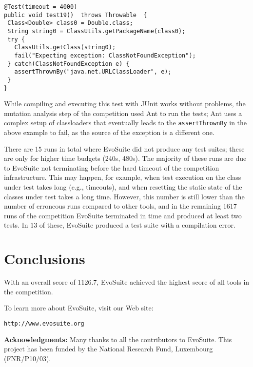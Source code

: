 \documentclass[10pt,conference]{IEEEtran}
\newcommand{\EVOSUITE}{{\sc EvoSuite}\xspace}
\begin{document}
\begin{lstlisting}
@Test(timeout = 4000)
public void test19()  throws Throwable  {
 Class<Double> class0 = Double.class;
 String string0 = ClassUtils.getPackageName(class0);
 try { 
   ClassUtils.getClass(string0);
   fail("Expecting exception: ClassNotFoundException"); 
 } catch(ClassNotFoundException e) {
   assertThrownBy("java.net.URLClassLoader", e);
 }
}
\end{lstlisting}

While compiling and executing this test with JUnit works without
problems, the mutation analysis step of the competition used Ant to
run the tests; Ant uses a complex setup of classloaders that
eventually leads to the \texttt{assertThrownBy} in the above example
to fail, as the source of the exception is a different one.

There are 15 runs in total where \EVOSUITE did not produce any test
suites; these are only for higher time budgets (240s, 480s). The
majority of these runs are due to \EVOSUITE not terminating before the
hard timeout of the competition infrastructure. This may happen, for
example, when test execution on the class under test takes long (e.g.,
timeouts), and when resetting the static state of the classes under
test takes a long time. However, this number is still lower than the
number of erroneous runs compared to other tools, and in the remaining
1617 runs of the competition \EVOSUITE terminated in time and produced
at least two tests. In 13 of these, \EVOSUITE produced a test suite
with a compilation error.

\section{Conclusions}

With an overall score of 1126.7, \EVOSUITE achieved the highest score
of all tools in the competition. 


To learn more about \EVOSUITE, visit our Web site:
\begin{center}
\texttt{http://www.evosuite.org}
\end{center}



\textbf{Acknowledgments:} Many thanks to all the contributors to \EVOSUITE.
This project has been funded by 
the National Research Fund, Luxembourg (FNR/P10/03).





\balance
\end{document}
